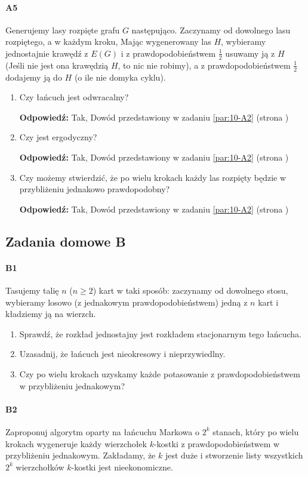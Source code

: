 \paragraph{A5} Generujemy lasy rozpięte grafu $G$ następująco. Zaczynamy od dowolnego lasu rozpiętego, a w każdym kroku, Mając wygenerowany las $H$, wybieramy jednostajnie krawędź z $E(G)$ i z prawdopodobieństwem $\frac{1}{2}$ usuwamy ją z $H$ (Jeśli nie jest ona krawędzią $H$, to nic nie robimy), a z prawdopodobieństwem $\frac{1}{2}$ dodajemy ją do $H$ (o ile nie domyka cyklu).
\begin{enumerate}[label=\alph*)]
\item Czy łańcuch jest odwracalny?

\textbf{Odpowiedź: }Tak, Dowód przedstawiony w zadaniu \ref{par:10-A2} (strona \pageref{par:10-A2})
\item Czy jest ergodyczny?

\textbf{Odpowiedź: }Tak, Dowód przedstawiony w zadaniu \ref{par:10-A2} (strona \pageref{par:10-A2})
\item Czy możemy stwierdzić, że po wielu krokach każdy las rozpięty będzie w przybliżeniu jednakowo prawdopodobny?

\textbf{Odpowiedź: }Tak, Dowód przedstawiony w zadaniu \ref{par:10-A2} (strona \pageref{par:10-A2})
\end{enumerate}

\subsection{Zadania domowe B}
\paragraph{B1} Tasujemy talię $n$ ($n \geq 2$) kart w taki sposób: zaczynamy od dowolnego stosu, wybieramy losowo (z jednakowym prawdopodobieństwem) jedną z $n$ kart i kładziemy ją na wierzch.
\begin{enumerate}[label=\alph*)]
\item Sprawdź, że rozkład jednostajny jest rozkładem stacjonarnym tego łańcucha.
\item Uzasadnij, że łańcuch jest nieokresowy i nieprzywiedlny.
\item Czy po wielu krokach uzyskamy każde potasowanie z prawdopodobieństwem w przybliżeniu jednakowym?
\end{enumerate}

\paragraph{B2} Zaproponuj algorytm oparty na łańcuchu Markowa o $2^k$ stanach, który po wielu krokach wygeneruje każdy wierzchołek $k$-kostki z prawdopodobieństwem w przybliżeniu jednakowym. Zakładamy, że $k$ jest duże i stworzenie listy wszystkich $2^k$ wierzchołków $k$-kostki jest nieekonomiczne.

